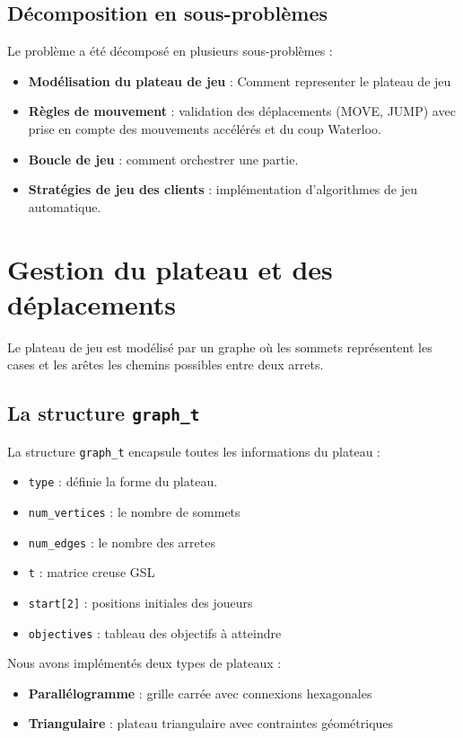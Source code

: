 \documentclass[12pt,a4paper]{article}
\begin{document}
\subsection{Décomposition en sous-problèmes}

Le problème a été décomposé en plusieurs sous-problèmes :
\begin{itemize}
  \item \textbf{Modélisation du plateau de jeu} : Comment representer le plateau de jeu
  \item \textbf{Règles de mouvement} : validation des déplacements (MOVE, JUMP) avec prise en compte des mouvements accélérés et du coup Waterloo.
  \item \textbf{Boucle de jeu} : comment orchestrer une partie.
  \item \textbf{Stratégies de jeu des clients} : implémentation d'algorithmes de jeu automatique.
\end{itemize}



\section{Gestion du plateau et des déplacements}
\label{sec:graphe}
Le plateau de jeu est modélisé par un graphe où les sommets représentent les cases et les arêtes les chemins possibles entre deux arrets.

\subsection{La structure \texttt{graph\_t}}

La structure \texttt{graph\_t} encapsule toutes les informations du plateau :
\begin{itemize}
  \item \texttt{type} : définie la forme du plateau.
  \item \texttt{num\_vertices} : le nombre de sommets \item \texttt{num\_edges} : le  nombre des arretes
  \item \texttt{t} : matrice creuse GSL
  \item \texttt{start[2]} : positions initiales des joueurs
  \item \texttt{objectives} : tableau des objectifs à atteindre
\end{itemize}

Nous avons implémentés deux types de plateaux :
\begin{itemize}
  \item \textbf{Parallélogramme} : grille carrée avec connexions hexagonales
  \item \textbf{Triangulaire} : plateau triangulaire avec contraintes géométriques
\end{itemize}
\end{document}
